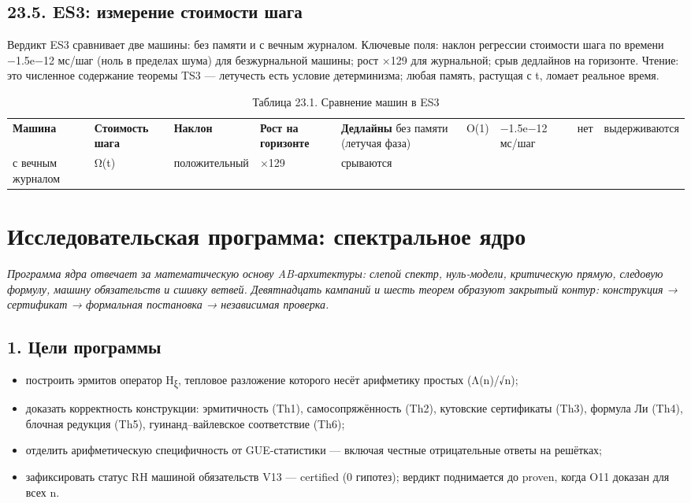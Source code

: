 \documentclass[11pt,a4paper]{article}
\begin{document}
\subsection{23.5. ES3: измерение стоимости шага}

Вердикт ES3 сравнивает две машины: без памяти и с вечным журналом. Ключевые поля: наклон регрессии стоимости шага по времени −1.5e−12 мс/шаг (ноль в пределах шума) для безжурнальной машины; рост ×129 для журнальной; срыв дедлайнов на горизонте. Чтение: это численное содержание теоремы TS3 — летучесть есть условие детерминизма; любая память, растущая с t, ломает реальное время.

\begin{table}[htbp]\centering\small
\caption{Таблица 23.1. Сравнение машин в ES3}
\begin{tabular}{p{} p{} p{} p{} p{}}
\toprule
\textbf{Машина} & \textbf{Стоимость шага} & \textbf{Наклон} & \textbf{Рост на горизонте} & \textbf{Дедлайны}
\midrule
без памяти (летучая фаза) & O(1) & −1.5e−12 мс/шаг & нет & выдерживаются \\
с вечным журналом & Ω(t) & положительный & ×129 & срываются \\
\bottomrule
\end{tabular}
\end{table}

\section{Исследовательская программа: спектральное ядро}

\noindent\textit{\color{copper}Программа ядра отвечает за математическую основу AB-архитектуры: слепой спектр, нуль-модели, критическую прямую, следовую формулу, машину обязательств и сшивку ветвей. Девятнадцать кампаний и шесть теорем образуют закрытый контур: конструкция → сертификат → формальная постановка → независимая проверка.}

\subsection{1. Цели программы}

\begin{itemize}
  \item построить эрмитов оператор H\textsubscript{ξ}, тепловое разложение которого несёт арифметику простых (Λ(n)/√n);
  \item доказать корректность конструкции: эрмитичность (Th1), самосопряжённость (Th2), кутовские сертификаты (Th3), формула Ли (Th4), блочная редукция (Th5), гуинанд–вайлевское соответствие (Th6);
  \item отделить арифметическую специфичность от GUE-статистики — включая честные отрицательные ответы на решётках;
  \item зафиксировать статус RH машиной обязательств V13 — certified (0 гипотез); вердикт поднимается до proven, когда O11 доказан для всех n.
\end{itemize}
\end{document}
